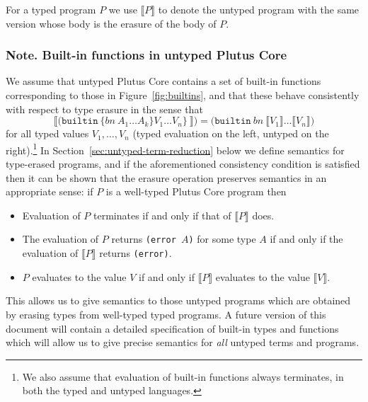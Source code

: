 \documentclass[a4paper]{article}
\newcommand{\keyword}[1]{\texttt{#1}}
\newcommand{\construct}[1]{\texttt{(} #1 \texttt{)}}
\newcommand{\builtin}[3]{\construct{\keyword{builtin} ~ \texttt{\{} \mathit{#1} ~ #2 \texttt{\}} ~ #3}}
\newcommand{\builtinU}[2]{\construct{\keyword{builtin} ~ \mathit{#1} ~ #2}}
\newcommand{\erase}[1]{\llbracket#1\rrbracket}
\begin{document}
For a typed program $P$ we use $\erase{P}$ to denote the untyped
program with the same version whose body is the erasure of the body of
$P$.





\subsubsection{Note. Built-in functions in untyped Plutus Core}
\label{sec:untyped-ck-builtins}
We assume that untyped Plutus Core contains a set of built-in functions
corresponding to those in Figure~\ref{fig:builtins}, and that these
behave consistently with respect to type erasure in the sense that
$$
\erase{\builtin{bn}{A_1 \ldots A_k\}{V_1 \ldots V_n}}} =
\builtinU{bn}{\erase{V_1} \ldots \erase{V_n}}
$$
for all typed values $V_1, \ldots, V_n$ (typed evaluation on the left,
untyped on the right).\footnote{We also assume that evaluation of
built-in functions always terminates, in both the typed and untyped
languages.}  In Section~\ref{sec:untyped-term-reduction} below we
define semantics for type-erased programs, and if the aforementioned
consistency condition is satisfied then it can be shown that the
erasure operation preserves semantics in an appropriate sense: if $P$
is a well-typed Plutus Core program then
\begin{itemize}
\item Evaluation of $P$ terminates if and only if that of $\erase{P}$ does.
\item The evaluation of $P$ returns \texttt{(error $A$)} for some type $A$
if and only if the evaluation of $\erase{P}$ returns \texttt{(error)}.
\item $P$ evaluates to the value $V$ if and only if $\erase{P}$ evaluates to the value
$\erase{V}$.
\end{itemize}
This allows
us to give semantics to those untyped programs which are obtained by
erasing types from well-typed typed programs.  A future version of
this document will contain a detailed specification of built-in types
and functions which will allow us to give precise semantics
for \textit{all} untyped terms and programs.
\end{document}
